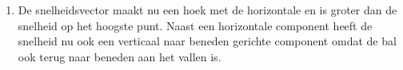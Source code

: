 \documentclass{ximera}
\begin{document}
\begin{denkvraag*}{}
\begin{oplossing}
\begin{enumerate}
        \item De snelheidsvector maakt nu een hoek met de horizontale en is groter dan de snelheid op het hoogste punt. Naast een horizontale component heeft de snelheid nu ook een verticaal naar beneden gerichte component omdat de bal ook terug naar beneden aan het vallen is.
    \end{enumerate}
\end{oplossing}
\end{denkvraag*} \nl

\begin{xmuitweiding}
\end{xmuitweiding}



\end{document}
